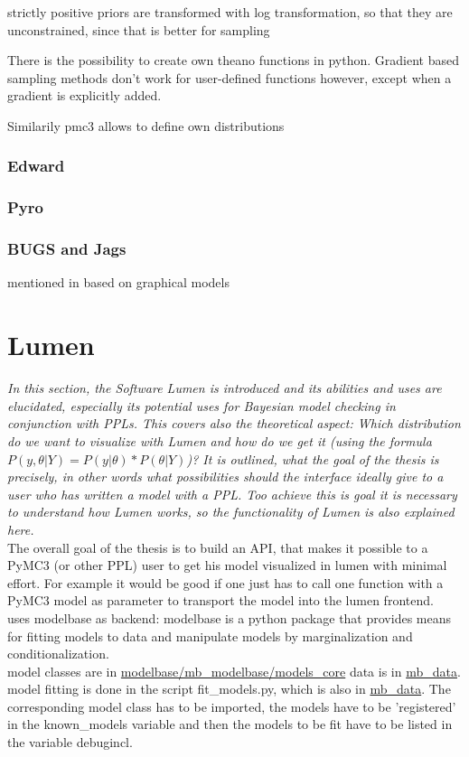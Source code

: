 \documentclass{article}
\begin{document}
strictly positive priors are transformed with log transformation, so that they are unconstrained, since that is better for sampling

There is the possibility to create own theano functions in python. Gradient based sampling methods don't work for user-defined functions however, except when a gradient is explicitly added.

Similarily pmc3 allows to define own distributions
\subsubsection{Edward}

\subsubsection{Pyro}
\subsubsection{BUGS and Jags}
mentioned in \cite{Gelman_2015}
based on graphical models

\section{Lumen}

\textit{In this section, the Software Lumen is introduced and its abilities and uses are elucidated, especially its potential uses for Bayesian model checking in conjunction with PPLs. This covers also the theoretical aspect: Which distribution do we want to visualize with Lumen and how do we get it (using the formula $P(y,\theta|Y) = P(y|\theta) * P(\theta|Y)$)? It is outlined, what the goal of the thesis is precisely, in other words what possibilities should the interface ideally give to a user who has written a model with a PPL. Too achieve this is goal it is necessary to understand how Lumen works, so the functionality of Lumen is also explained here.} 
\\
The overall goal of the thesis is to build an API, that makes it possible to a PyMC3 (or other PPL) user to get his model visualized in lumen with minimal effort. For example it would be good if one just has to call one function with a PyMC3 model as parameter to transport the model into the lumen frontend.
\\
uses modelbase as backend: modelbase is a python package that provides means for fitting models to data and manipulate models by marginalization and conditionalization.
\\
model classes are in \url{modelbase/mb_modelbase/models_core}
data is in \url{mb_data}. model fitting is done in the script fit\_models.py, which is also in \url{mb_data}. The corresponding model class has to be imported, the models have to be 'registered' in the known\_models variable and then the models to be fit have to be listed in the variable debugincl.
\end{document}
